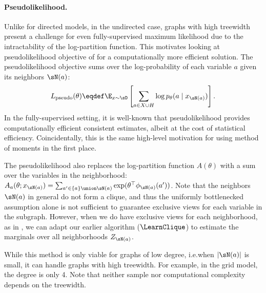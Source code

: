 \paragraph{Pseudolikelihood.}
Unlike for directed models, in the undirected case,
graphs with high treewidth present a challenge
for even fully-supervised maximum likelihood due to the intractability of the log-partition function.
This motivates looking at pseudolikelihood objective of \citep{besag75pseudo} for a computationally more
efficient solution.
The pseudolikelihood objective sums over the log-probability of each variable $a$ given its neighbors $\sN(a)$:
$$L_\text{pseudo}(\theta) \eqdef \E_{x \sim \sD}\left[\sum_{a \in X \cup H} \log p_\theta(a \mid x_{\sN(a)})\right].$$
In the fully-supervised setting, it is well-known that pseudolikelihood provides computationally efficient consistent estimates,
albeit at the cost of statistical efficiency.
Coincidentally, this is the same high-level motivation for using method of moments in the first place.


The pseudolikelihood also replaces the log-partition function
  $A(\theta)$ with a sum over the variables in the neighborhood:
  $A_a(\theta; x_{\sN(a)}) = \sum_{a' \in \{a\} \union \sN(a)}
  \exp(\theta^\top\phi_{\sN(a)}(a'))$.
Note that the neighbors $\sN(a)$ in general do not form a clique, and
  thus the uniformly bottlenecked assumption alone is not sufficient to
  guarantee exclusive views for each variable in the subgraph.
However, when we do have exclusive views for each neighborhood, as in
  , we can adapt our earlier algorithm
  ($\LearnClique$) to estimate the marginals over all neighborhoods $Z_{\sN(a)}$.


While this method is only viable for graphs of low degree, i.e.\@ when $|\sN(a)|$ is small,
it can handle graphs with high treewidth.
For example, in the grid model, the degree is only 4.
Note that neither sample nor computational complexity depends on the treewidth.

